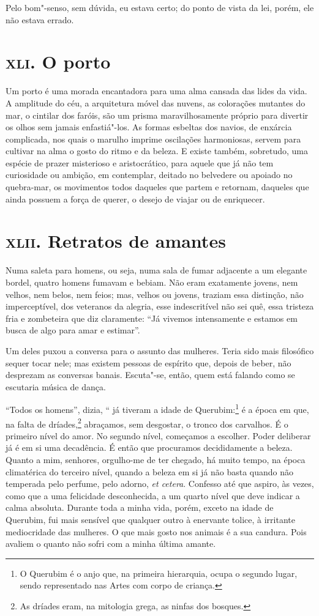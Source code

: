 Pelo bom"-senso, sem dúvida, eu estava certo; do ponto de vista
da lei, porém, ele não estava errado.

\chapter{\textsc{xli.} O porto}

Um porto é uma morada encantadora para uma alma cansada das lides da
vida. A amplitude do céu, a arquitetura móvel das nuvens, as colorações
mutantes do mar, o cintilar dos faróis, são um prisma maravilhosamente
próprio para divertir os olhos sem jamais enfastiá"-los. As formas
esbeltas dos navios, de enxárcia complicada, nos quais o marulho
imprime oscilações harmoniosas, servem para cultivar na alma o gosto
do ritmo e da beleza. E existe também, sobretudo, uma espécie de prazer
misterioso e aristocrático, para aquele que já não tem curiosidade
ou ambição, em contemplar, deitado no belvedere ou apoiado no
quebra-mar, os movimentos todos daqueles que partem e 
retornam, daqueles que ainda possuem a força de querer, o desejo de
viajar ou de enriquecer.

\chapter{\textsc{xlii.} Retratos de amantes}

Numa saleta para homens, ou seja, numa sala de fumar adjacente a um
elegante bordel, quatro homens fumavam e bebiam. Não eram
exatamente jovens, nem velhos, nem belos, nem feios; mas, velhos ou
jovens, traziam essa distinção, não imperceptível, dos veteranos da
alegria, esse indescritível não sei quê, essa tristeza fria e zombeteira
que diz claramente: “Já vivemos intensamente e
estamos em busca de algo para amar e estimar''.

Um deles puxou a conversa para o assunto das mulheres. Teria sido mais
filosófico sequer tocar nele; mas existem pessoas de espírito que,
depois de beber, não desprezam as conversas banais. Escuta"-se, então,
quem está falando como se escutaria música de dança.

“Todos os homens'', dizia, “ já tiveram a idade de
Querubim:\footnote{ O Querubim é o anjo que, na primeira hierarquia, ocupa o segundo
lugar, sendo representado nas Artes com corpo de criança.}
 é a época em que, na falta de
dríades,\footnote{ As dríades eram, na mitologia grega, 
as ninfas dos bosques.} abraçamos, sem desgostar, o tronco dos
carvalhos. É o primeiro nível do amor. No segundo nível, começamos a
escolher. Poder deliberar já é em si uma decadência. É então que procuramos
decididamente a beleza. Quanto a mim, senhores, orgulho-me de ter
chegado, há muito tempo, na época climatérica do terceiro nível, quando
a beleza em si já não basta quando não temperada pelo perfume, pelo
adorno, \textit{et cetera}. Confesso até que aspiro, às vezes, como que a uma
felicidade desconhecida, a um quarto nível que deve indicar a calma
absoluta. Durante toda a minha vida, porém, exceto na idade de Querubim,
fui mais sensível que qualquer outro à enervante tolice, à irritante
mediocridade das mulheres. O que mais gosto nos animais é a sua
candura. Pois avaliem o quanto não sofri com a minha última
amante.

